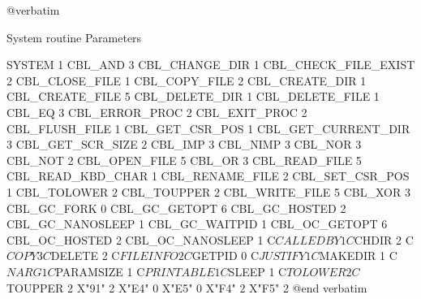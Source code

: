 @verbatim


System routine                  Parameters

SYSTEM                          1
CBL_AND                         3
CBL_CHANGE_DIR                  1
CBL_CHECK_FILE_EXIST            2
CBL_CLOSE_FILE                  1
CBL_COPY_FILE                   2
CBL_CREATE_DIR                  1
CBL_CREATE_FILE                 5
CBL_DELETE_DIR                  1
CBL_DELETE_FILE                 1
CBL_EQ                          3
CBL_ERROR_PROC                  2
CBL_EXIT_PROC                   2
CBL_FLUSH_FILE                  1
CBL_GET_CSR_POS                 1
CBL_GET_CURRENT_DIR             3
CBL_GET_SCR_SIZE                2
CBL_IMP                         3
CBL_NIMP                        3
CBL_NOR                         3
CBL_NOT                         2
CBL_OPEN_FILE                   5
CBL_OR                          3
CBL_READ_FILE                   5
CBL_READ_KBD_CHAR               1
CBL_RENAME_FILE                 2
CBL_SET_CSR_POS                 1
CBL_TOLOWER                     2
CBL_TOUPPER                     2
CBL_WRITE_FILE                  5
CBL_XOR                         3
CBL_GC_FORK                     0
CBL_GC_GETOPT                   6
CBL_GC_HOSTED                   2
CBL_GC_NANOSLEEP                1
CBL_GC_WAITPID                  1
CBL_OC_GETOPT                   6
CBL_OC_HOSTED                   2
CBL_OC_NANOSLEEP                1
C$CALLEDBY                      1
C$CHDIR                         2
C$COPY                          3
C$DELETE                        2
C$FILEINFO                      2
C$GETPID                        0
C$JUSTIFY                       1
C$MAKEDIR                       1
C$NARG                          1
C$PARAMSIZE                     1
C$PRINTABLE                     1
C$SLEEP                         1
C$TOLOWER                       2
C$TOUPPER                       2
X"91"                           2
X"E4"                           0
X"E5"                           0
X"F4"                           2
X"F5"                           2
@end verbatim

